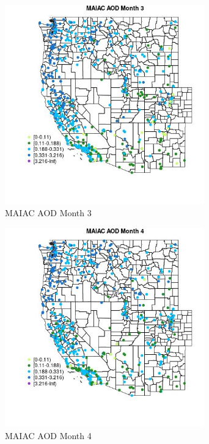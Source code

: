 \begin{figure} 
\centering  
\includegraphics[width=0.77\textwidth]{Code_Outputs/Report_ML_input_PM25_Step4_part_e_de_duplicated_aves_compiled_2019-05-14wNAs_MapObsMo3MAIAC_AOD.jpg} 
\caption{\label{fig:Report_ML_input_PM25_Step4_part_e_de_duplicated_aves_compiled_2019-05-14wNAsMapObsMo3MAIAC_AOD}MAIAC AOD Month 3} 
\end{figure} 
 

\begin{figure} 
\centering  
\includegraphics[width=0.77\textwidth]{Code_Outputs/Report_ML_input_PM25_Step4_part_e_de_duplicated_aves_compiled_2019-05-14wNAs_MapObsMo4MAIAC_AOD.jpg} 
\caption{\label{fig:Report_ML_input_PM25_Step4_part_e_de_duplicated_aves_compiled_2019-05-14wNAsMapObsMo4MAIAC_AOD}MAIAC AOD Month 4} 
\end{figure} 
 

